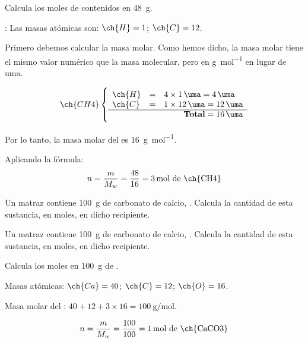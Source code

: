 \begin{example}{}

    Calcula los moles de  contenidos en \qty{48}{\g}.

    \datos{}: Las masas atómicas son: \( \ch{H} = 1 \); \( \ch{C} = 12 \).

    Primero debemos calcular la masa molar. Como hemos dicho, la masa molar tiene el mismo valor numérico que la masa molecular, pero en \unit{\g\per\mole} en lugar de uma.

    \[
        \ch{CH4} \left\{\rule{0pt}{0.8cm}
                     \begin{array}{lcl}
                         \ch{H} &=& 4 \times \qty{1}{\uma} = \qty{4}{\uma} \\
                         \ch{C} &=& 1 \times \qty{12}{\uma} = \qty{12}{\uma} \\
                         \cline{1-3}
                         \multicolumn{3}{r}{\textbf{Total} = \qty{16}{\uma} }
                     \end{array}
        \right.
    \]

    Por lo tanto, la masa molar del  es \qty{16}{\g\per\mole}.

    Aplicando la fórmula:
    \begin{equation*}
        n = \dfrac{m}{M_w} = \dfrac{48}{16} = \qty{3}{\mole} \text{ de \ch{CH4}}
    \end{equation*}
\end{example}



\begin{exercise}
    Un matraz contiene \qty{100}{\g} de carbonato de calcio, . Calcula la cantidad de esta sustancia, en moles, en dicho recipiente.
    \begin{solu}
        Un matraz contiene \qty{100}{\g} de carbonato de calcio, . Calcula la cantidad de esta sustancia, en moles, en dicho recipiente.

        Calcula los moles en \qty{100}{\g} de .

        Masas atómicas: \( \ch{Ca} = 40 \); \( \ch{C} = 12 \); \( \ch{O} = 16 \).

        Masa molar del : \( 40 + 12 + 3 \times 16 = \qty{100}{\g\per\mole} \).

        \begin{equation*}
            n = \dfrac{m}{M_w} = \dfrac{100}{100} = \qty{1}{\mole} \text{ de \ch{CaCO3}}
        \end{equation*}
    \end{solu}
\end{exercise}

